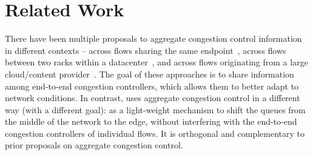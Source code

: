\section{Related Work}
\label{s:related}


 There have been multiple proposals to aggregate congestion control information in different contexts -- across flows sharing the same endpoint~\cite{cm}, across flows between two racks within a datacenter~\cite{rackcc}, and across flows originating from a large cloud/content provider~\cite{fivecomps}. The goal of these approaches is to share information among end-to-end congestion controllers, which allows them to better adapt to network conditions.  
In contrast, \name uses aggregate congestion control in a different way (with a different goal): as a light-weight mechanism to shift the queues from the middle of the network to the edge, without interfering with the end-to-end congestion controllers of individual flows. It is orthogonal and complementary to prior proposals on aggregate congestion control. 



